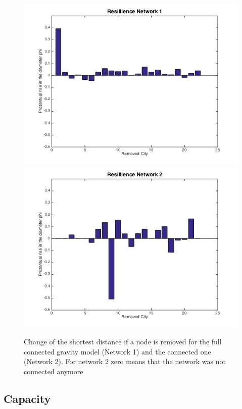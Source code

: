 \documentclass[11pt]{article}
\begin{document}
\begin{figure}
\includegraphics[scale=0.4]{fullConnedtedShortestNetworkDistanceChange}
\includegraphics[scale=0.4]{connectedNetworkDistanceChange}
 \caption{Change of the shortest distance if a node is removed for the full connected gravity model (Network 1) and the connected one (Network 2). For network 2 zero means that the network was not connected anymore}
\end{figure}


\subsection{Capacity}
\end{document}
